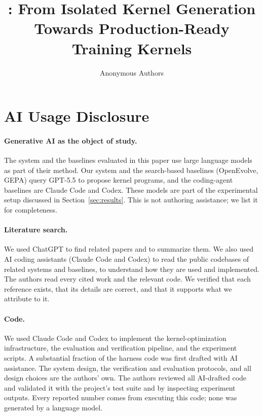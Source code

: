 \documentclass[letterpaper,twocolumn,10pt]{article}
\begin{document}
\date{}
\title{\Large \bf \name: From Isolated Kernel Generation Towards Production-Ready Training Kernels}
\author{{\rm Anonymous Authors}}
\maketitle








% 


\section*{AI Usage Disclosure}

\paragraph{Generative AI as the object of study.}
The system and the baselines evaluated in this paper use large language models
as part of their method. Our system and the search-based baselines (OpenEvolve,
GEPA) query GPT-5.5 to propose kernel programs, and the coding-agent baselines
are Claude Code and Codex. These models are part of the experimental setup
discussed in Section~\ref{sec:results}. This is not authoring assistance; we
list it for completeness.

\paragraph{Literature search.}
We used ChatGPT to find related papers and to summarize them. We also used AI
coding assistants (Claude Code and Codex) to read the public codebases of
related systems and baselines, to understand how they are used and implemented.
The authors read every cited work and the relevant code. We verified that each
reference exists, that its details are correct, and that it supports what we
attribute to it.

\paragraph{Code.}
We used Claude Code and Codex to implement the kernel-optimization infrastructure, the
evaluation and verification pipeline, and the experiment scripts. A substantial
fraction of the harness code was first drafted with AI assistance. The system
design, the verification and evaluation protocols, and all design choices are the
authors' own. The authors reviewed all AI-drafted code and validated it with
the project's test suite and by inspecting experiment outputs. Every reported
number comes from executing this code; none was generated by a language model.
\end{document}

